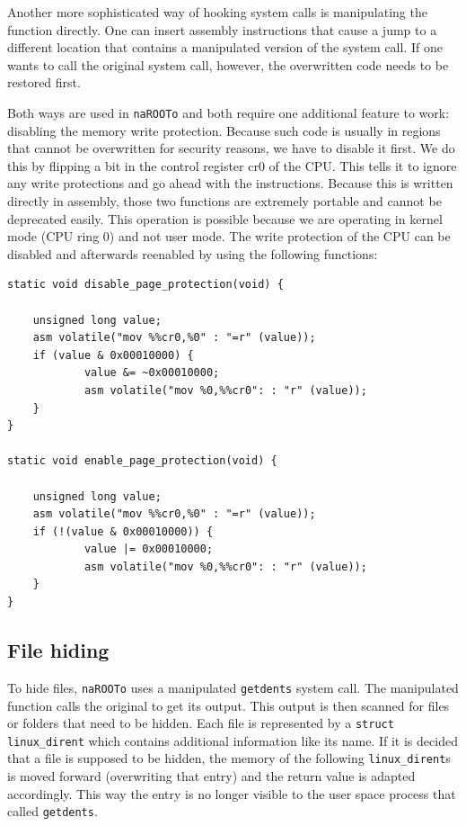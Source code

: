 \documentclass[10pt, letterpaper]{scrartcl}
\begin{document}
Another more sophisticated way of hooking system calls is manipulating the function directly.
One can insert assembly instructions that cause a jump to a different location that contains a manipulated version of the system call.
If one wants to call the original system call, however, the overwritten code needs to be restored first.

Both ways are used in \texttt{naROOTo} and both require one additional feature to work: disabling the memory write protection. 
Because such code is usually in regions that cannot be overwritten for security reasons, we have to disable it first.
We do this by flipping a bit in the control register cr0 of the CPU.
This tells it to ignore any write protections and go ahead with the instructions.
Because this is written directly in assembly, those two functions are extremely portable and cannot be deprecated easily.
This operation is possible because we are operating in kernel mode (CPU ring 0) and not user mode.
The write protection of the CPU can be disabled and afterwards reenabled by using the following functions:

\begin{verbatim}
static void disable_page_protection(void) {

    unsigned long value;
    asm volatile("mov %%cr0,%0" : "=r" (value));
    if (value & 0x00010000) {
            value &= ~0x00010000;
            asm volatile("mov %0,%%cr0": : "r" (value));
    }
}

static void enable_page_protection(void) {

    unsigned long value;
    asm volatile("mov %%cr0,%0" : "=r" (value));
    if (!(value & 0x00010000)) {
            value |= 0x00010000;
            asm volatile("mov %0,%%cr0": : "r" (value));
    }
}
\end{verbatim}

\subsection{File hiding}
To hide files, \texttt{naROOTo} uses a manipulated \texttt{getdents} system call.
The manipulated function calls the original to get its output.
This output is then scanned for files or folders that need to be hidden.
Each file is represented by a \texttt{struct linux\_dirent} which contains additional information like its name.
If it is decided that a file is supposed to be hidden, the memory of the following \texttt{linux\_dirent}s is moved forward (overwriting that entry) and the return value is adapted accordingly.
This way the entry is no longer visible to the user space process that called \texttt{getdents}.
\end{document}
